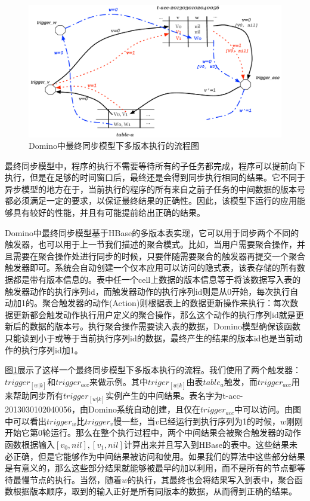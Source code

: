 \begin{figure}[]
\centering
\includegraphics[width=5.5in]{../figures/multiv.pdf}
\caption{Domino中最终同步模型下多版本执行的流程图}
\label{fig:multiv}
\end{figure}

最终同步模型中，程序的执行不需要等待所有的子任务都完成，程序可以提前向下执行，但是在足够的时间窗口后，最终还是会得到同步执行相同的结果。它不同于异步模型的地方在于，当前执行的程序的所有来自之前子任务的中间数据的版本号都必须满足一定的要求，以保证最终结果的正确性。因此，该模型下运行的应用能够具有较好的性能，并且有可能提前给出正确的结果。

Domino中最终同步模型基于HBase的多版本表实现，它可以用于同步两个不同的触发器，也可以用于上一节我们描述的聚合模式。比如，当用户需要聚合操作，并且需要在聚合操作处进行同步的时候，只要伴随需要聚合的触发器再提交一个聚合触发器即可。系统会自动创建一个仅本应用可以访问的隐式表，该表存储的所有数据都是带有版本信息的。表中任一个cell上数据的版本信息等于将该数据写入表的触发器动作的执行序列id，而触发器动作的执行序列id则是从0开始，每次执行自动加1的。聚合触发器的动作(Action)则根据表上的数据更新操作来执行：每次数据更新都会触发动作执行用户定义的聚合操作，那么这个动作的执行序列id就是更新后的数据的版本号。执行聚合操作需要读入表的数据，Domino模型确保该函数只能读到小于或等于当前执行序列id的数据，最终产生的结果的版本id也是当前动作的执行序列id加1。

图\ref{fig:multiv}展示了这样一个最终同步模型下多版本执行的流程。我们使用了两个触发器：$trigger_{[w|k]}$和$trigger_{acc}$来做示例。其中$triger_{[w|k]}$由表$table_a$触发，而$trigger_{acc}$用来帮助同步所有$trigger_{[w|k]}$实例产生的中间结果。表名字为t-acc-2013030102040056，由Domino系统自动创建，且仅在$trigger_{acc}$中可以访问。由图中可以看出$trigger_w$比$trigger_v$慢一些，当$v$已经运行到执行序列为1的时候，$w$刚刚开始它第0轮运行。那么在整个执行过程中，两个中间结果会被聚合触发器的动作函数根据输入$[v_0, nil], [v_1, nil]$计算出来并且写入到HBase的表中。这些结果未必正确，但是它能够作为中间结果被访问和使用。如果我们的算法中这些部分结果是有意义的，那么这些部分结果就能够被最早的加以利用，而不是所有的节点都等待最慢节点的执行。当然，随着$w$的执行，其最终也会将结果写入到表中，聚合函数根据版本顺序，取到的输入正好是所有同版本的数据，从而得到正确的结果。


